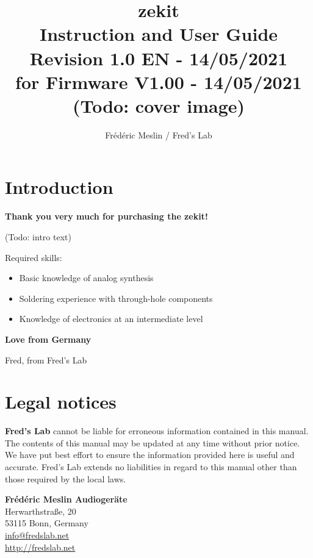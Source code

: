 \documentclass{scrartcl}
\title{
    \vspace*{4cm}
    \huge{zekit} \\
    Instruction and User Guide \\
    \vspace*{0.25cm}
    \small{Revision 1.0 EN - 14/05/2021} \\
    \small{for Firmware V1.00 - 14/05/2021} \\
    \vspace*{0.5cm}
    (Todo: cover image)
}
\author{Frédéric Meslin / Fred's Lab}
\begin{document}
\maketitle

\pagebreak


\section*{Introduction}

\textbf{Thank you very much for purchasing the zekit!}

(Todo: intro text)

Required skills:

\begin{itemize}
    \item Basic knowledge of analog synthesis
    \item Soldering experience with through-hole components
    \item Knowledge of electronics at an intermediate level
\end{itemize}

\textbf{Love from Germany}
\begin{flushright}
    Fred, from Fred's Lab
\end{flushright}

\section*{Legal notices}
\textbf{Fred's Lab} cannot be liable for erroneous information contained in this manual. The contents of this manual may be updated at any time without prior notice. We have put best effort to ensure the information provided here is useful and accurate. Fred's Lab extends no liabilities in regard to this manual other than those required by the local laws.

\begin{center}
    \textbf{Frédéric Meslin Audiogeräte} \\
    Herwarthstraße, 20 \\
    53115 Bonn, Germany \\
    \url{info@fredslab.net} \\
    \url{http://fredslab.net} \\
\end{center}
\end{document}
